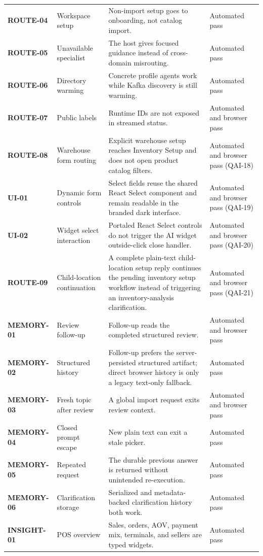 \documentclass[10pt]{article}
\begin{document}
\begin{longtable}{@{}>{\bfseries\color{navy}}p{}@{\hspace{0.7em}} p{}@{\hspace{0.7em}} p{}@{\hspace{0.7em}} p{}@{}}
ROUTE-04 & Workspace setup & Non-import setup goes to onboarding, not catalog import. & Automated pass \\
ROUTE-05 & Unavailable specialist & The host gives focused guidance instead of cross-domain misrouting. & Automated pass \\
ROUTE-06 & Directory warming & Concrete profile agents work while Kafka discovery is still warming. & Automated pass \\
ROUTE-07 & Public labels & Runtime IDs are not exposed in streamed status. & Automated and browser pass \\
ROUTE-08 & Warehouse form routing & Explicit warehouse setup reaches Inventory Setup and does not open product catalog filters. & Automated and browser pass (QAI-18) \\
UI-01 & Dynamic form controls & Select fields reuse the shared React Select component and remain readable in the branded dark interface. & Automated and browser pass (QAI-19) \\
UI-02 & Widget select interaction & Portaled React Select controls do not trigger the AI widget outside-click close handler. & Automated and browser pass (QAI-20) \\
ROUTE-09 & Child-location continuation & A complete plain-text child-location setup reply continues the pending inventory setup workflow instead of triggering an inventory-analysis clarification. & Automated and browser pass (QAI-21) \\
MEMORY-01 & Review follow-up & Follow-up reads the completed structured review. & Automated and browser pass \\
MEMORY-02 & Structured history & Follow-up prefers the server-persisted structured artifact; direct browser history is only a legacy text-only fallback. & Automated pass \\
MEMORY-03 & Fresh topic after review & A global import request exits review context. & Automated and browser pass \\
MEMORY-04 & Closed prompt escape & New plain text can exit a stale picker. & Automated pass \\
MEMORY-05 & Repeated request & The durable previous answer is returned without unintended re-execution. & Automated pass \\
MEMORY-06 & Clarification storage & Serialized and metadata-backed clarification history both work. & Automated pass \\
INSIGHT-01 & POS overview & Sales, orders, AOV, payment mix, terminals, and sellers are typed widgets. & Automated pass \\

\end{longtable}
\end{document}
